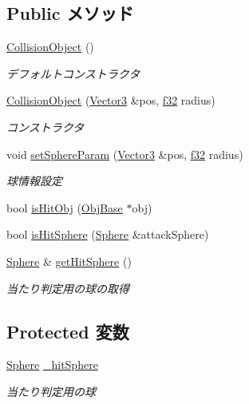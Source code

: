 \subsection*{Public メソッド}
\begin{DoxyCompactItemize}
\item 
\hyperlink{class_collision_object_ac9677c53a2edb172dca4703e759379bf}{Collision\-Object} ()
\begin{DoxyCompactList}\small\item\em デフォルトコンストラクタ \end{DoxyCompactList}\item 
\hyperlink{class_collision_object_ab2891150c91ae9267f846449ebe3c709}{Collision\-Object} (\hyperlink{struct_vector3}{Vector3} \&pos, \hyperlink{_main_8h_a5f6906312a689f27d70e9d086649d3fd}{f32} radius)
\begin{DoxyCompactList}\small\item\em コンストラクタ \end{DoxyCompactList}\item 
void \hyperlink{class_collision_object_a8a9ad3b2608c2737c2bc69a2b2791094}{set\-Sphere\-Param} (\hyperlink{struct_vector3}{Vector3} \&pos, \hyperlink{_main_8h_a5f6906312a689f27d70e9d086649d3fd}{f32} radius)
\begin{DoxyCompactList}\small\item\em 球情報設定 \end{DoxyCompactList}\item 
bool \hyperlink{class_collision_object_a2574ee166a554985f4ea60ddd57f27db}{is\-Hit\-Obj} (\hyperlink{class_obj_base}{Obj\-Base} $\ast$obj)
\item 
bool \hyperlink{class_collision_object_ab006cfd3dc853eda7729a7b7e07a1d25}{is\-Hit\-Sphere} (\hyperlink{struct_sphere}{Sphere} \&attack\-Sphere)
\item 
\hyperlink{struct_sphere}{Sphere} \& \hyperlink{class_collision_object_afba2c3a210f9c209e37f1d1b902e23b8}{get\-Hit\-Sphere} ()
\begin{DoxyCompactList}\small\item\em 当たり判定用の球の取得 \end{DoxyCompactList}\end{DoxyCompactItemize}
\subsection*{Protected 変数}
\begin{DoxyCompactItemize}
\item 
\hyperlink{struct_sphere}{Sphere} \hyperlink{class_collision_object_afd1c8612ad380f08cf3f2a5bf4b3daab}{\-\_\-hit\-Sphere}
\begin{DoxyCompactList}\small\item\em 当たり判定用の球 \end{DoxyCompactList}\end{DoxyCompactItemize}


